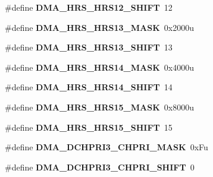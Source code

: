 \begin{DoxyCompactItemize}
\item 
\#define {\bfseries D\+M\+A\+\_\+\+H\+R\+S\+\_\+\+H\+R\+S12\+\_\+\+S\+H\+I\+FT}~12\hypertarget{group__DMA__Register__Masks_ga1d9f2a43a4fe7a7ad7f1a74547ba895d}{}\label{group__DMA__Register__Masks_ga1d9f2a43a4fe7a7ad7f1a74547ba895d}

\item 
\#define {\bfseries D\+M\+A\+\_\+\+H\+R\+S\+\_\+\+H\+R\+S13\+\_\+\+M\+A\+SK}~0x2000u\hypertarget{group__DMA__Register__Masks_ga918fc7b0985cbe11be58212390f1c816}{}\label{group__DMA__Register__Masks_ga918fc7b0985cbe11be58212390f1c816}

\item 
\#define {\bfseries D\+M\+A\+\_\+\+H\+R\+S\+\_\+\+H\+R\+S13\+\_\+\+S\+H\+I\+FT}~13\hypertarget{group__DMA__Register__Masks_gadffc24f95572e6aab3e33fefe1c1806c}{}\label{group__DMA__Register__Masks_gadffc24f95572e6aab3e33fefe1c1806c}

\item 
\#define {\bfseries D\+M\+A\+\_\+\+H\+R\+S\+\_\+\+H\+R\+S14\+\_\+\+M\+A\+SK}~0x4000u\hypertarget{group__DMA__Register__Masks_ga70ee6df2c5cce431c6b9d3e3f958bd69}{}\label{group__DMA__Register__Masks_ga70ee6df2c5cce431c6b9d3e3f958bd69}

\item 
\#define {\bfseries D\+M\+A\+\_\+\+H\+R\+S\+\_\+\+H\+R\+S14\+\_\+\+S\+H\+I\+FT}~14\hypertarget{group__DMA__Register__Masks_ga183e6503c7ed5e4b07f9df2bf47d46a9}{}\label{group__DMA__Register__Masks_ga183e6503c7ed5e4b07f9df2bf47d46a9}

\item 
\#define {\bfseries D\+M\+A\+\_\+\+H\+R\+S\+\_\+\+H\+R\+S15\+\_\+\+M\+A\+SK}~0x8000u\hypertarget{group__DMA__Register__Masks_ga95ddced80fcb33b665fa1b6aad38210b}{}\label{group__DMA__Register__Masks_ga95ddced80fcb33b665fa1b6aad38210b}

\item 
\#define {\bfseries D\+M\+A\+\_\+\+H\+R\+S\+\_\+\+H\+R\+S15\+\_\+\+S\+H\+I\+FT}~15\hypertarget{group__DMA__Register__Masks_gac91c063a84c76a6cf385cd3bda8f244a}{}\label{group__DMA__Register__Masks_gac91c063a84c76a6cf385cd3bda8f244a}

\item 
\#define {\bfseries D\+M\+A\+\_\+\+D\+C\+H\+P\+R\+I3\+\_\+\+C\+H\+P\+R\+I\+\_\+\+M\+A\+SK}~0x\+Fu\hypertarget{group__DMA__Register__Masks_ga4d1165f5fe24dfa63c7496f07b15e5e2}{}\label{group__DMA__Register__Masks_ga4d1165f5fe24dfa63c7496f07b15e5e2}

\item 
\#define {\bfseries D\+M\+A\+\_\+\+D\+C\+H\+P\+R\+I3\+\_\+\+C\+H\+P\+R\+I\+\_\+\+S\+H\+I\+FT}~0\hypertarget{group__DMA__Register__Masks_gacae7dcb7b9055f80ce91ce52e36d57b6}{}\label{group__DMA__Register__Masks_gacae7dcb7b9055f80ce91ce52e36d57b6}


\end{DoxyCompactItemize}
